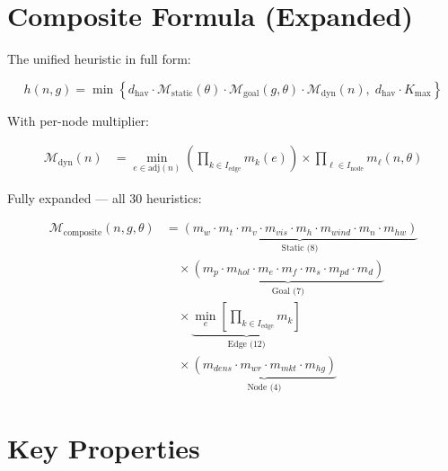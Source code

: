 \documentclass[12pt,a4paper]{article}
\newcommand{\M}{\mathcal{M}}
\newcommand{\Kmax}{K_{\max}}
\newcommand{\dhat}{d_{\text{hav}}}
\newcommand{\Adj}{\text{adj}}
\begin{document}
\section*{Composite Formula (Expanded)}

The unified heuristic in full form:

\[
\boxed{
h(n, g) = \min\left\{ \dhat \cdot \M_{\text{static}}(\theta) \cdot \M_{\text{goal}}(g, \theta) \cdot \M_{\text{dyn}}(n), \; \dhat \cdot \Kmax \right\}
}
\]

With per-node multiplier:

\[
\begin{aligned}
\M_{\text{dyn}}(n) &= \min_{e \in \Adj(n)} \left( \prod_{k \in I_{\text{edge}}} m_k(e) \right) \times \prod_{\ell \in I_{\text{node}}} m_\ell(n, \theta)
\end{aligned}
\]

Fully expanded — all 30 heuristics:

\[
\begin{aligned}
\M_{\text{composite}}(n, g, \theta) &= \underbrace{(m_w \cdot m_t \cdot m_v \cdot m_{vis} \cdot m_h \cdot m_{wind} \cdot m_n \cdot m_{hw})}_{\text{Static (8)}} \\
&\quad \times \underbrace{(m_p \cdot m_{hol} \cdot m_e \cdot m_f \cdot m_s \cdot m_{pd} \cdot m_d)}_{\text{Goal (7)}} \\
&\quad \times \underbrace{\min_e \left[ \prod_{k \in I_{\text{edge}}} m_k \right]}_{\text{Edge (12)}} \\
&\quad \times \underbrace{(m_{dens} \cdot m_{wr} \cdot m_{mkt} \cdot m_{hg})}_{\text{Node (4)}}
\end{aligned}
\]

\section*{Key Properties}
\end{document}

